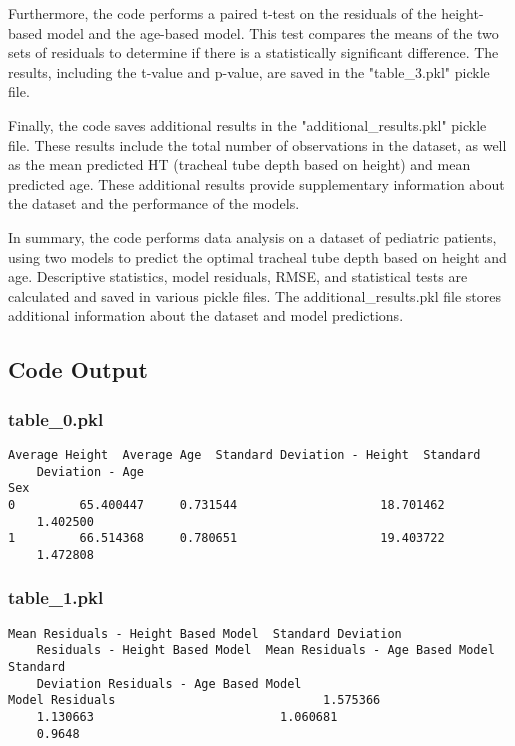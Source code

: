 \documentclass[11pt]{article}
\begin{document}
Furthermore, the code performs a paired t-test on the residuals of the height-based model and the age-based model. This test compares the means of the two sets of residuals to determine if there is a statistically significant difference. The results, including the t-value and p-value, are saved in the "table\_3.pkl" pickle file.

Finally, the code saves additional results in the "additional\_results.pkl" pickle file. These results include the total number of observations in the dataset, as well as the mean predicted HT (tracheal tube depth based on height) and mean predicted age. These additional results provide supplementary information about the dataset and the performance of the models.

In summary, the code performs data analysis on a dataset of pediatric patients, using two models to predict the optimal tracheal tube depth based on height and age. Descriptive statistics, model residuals, RMSE, and statistical tests are calculated and saved in various pickle files. The additional\_results.pkl file stores additional information about the dataset and model predictions.

\subsection{Code Output}

\subsubsection*{table\_0.pkl}

\begin{Verbatim}[tabsize=4]
     Average Height  Average Age  Standard Deviation - Height  Standard
	Deviation - Age
Sex
0         65.400447     0.731544                    18.701462
	1.402500
1         66.514368     0.780651                    19.403722
	1.472808
\end{Verbatim}

\subsubsection*{table\_1.pkl}

\begin{Verbatim}[tabsize=4]
                 Mean Residuals - Height Based Model  Standard Deviation
	Residuals - Height Based Model  Mean Residuals - Age Based Model  Standard
	Deviation Residuals - Age Based Model
Model Residuals                             1.575366
	1.130663                          1.060681
	0.9648
\end{Verbatim}
\end{document}
